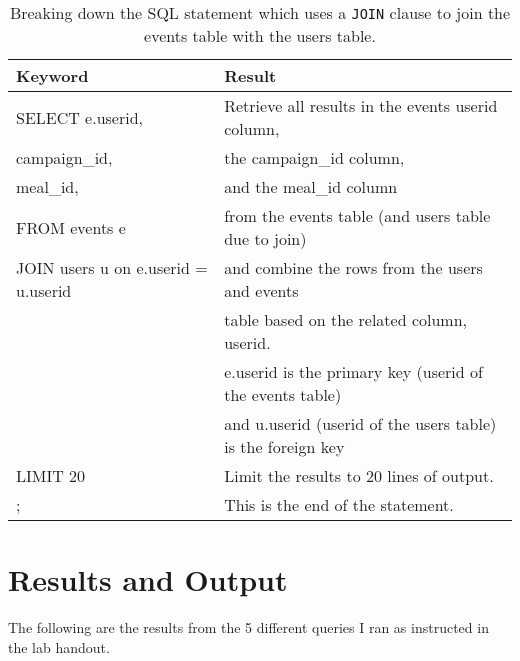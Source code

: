 \documentclass[]{article}
\newcommand{\code}[1]{\colorbox{light-gray}{\texttt{#1}}}
\begin{document}
\begin{enumerate}
\begin{table}[!ht]
	\centering
	\begin{tabular}{| l | l |}
		\hline
		Keyword & Result \\
		\hline
		SELECT e.userid, & Retrieve all results in the events userid column, \\
		campaign\_id, & the campaign\_id column, \\
		meal\_id, & and the meal\_id column \\
		FROM events e & from the events table (and users table due to join) \\
		JOIN users u on e.userid = u.userid & and combine the rows from the users and events  \\
		& table based on the related column, userid.  \\
		& e.userid is the primary key (userid of the events table) \\
		& and u.userid (userid of the users table) is the foreign key\\
		LIMIT 20 & Limit the results to 20 lines of output. \\
		; & This is the end of the statement.\\
		\hline
	\end{tabular}
	\caption{Breaking down the SQL statement which uses a \code{JOIN} clause to join the events table with the users table.}
\end{table}
\end{enumerate}

\section{Results and Output}

The following are the results from the 5 different queries I ran as instructed in the lab handout.
\end{document}
